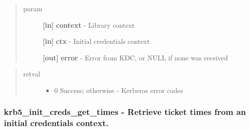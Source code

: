 \documentclass[letterpaper,10pt,english]{sphinxmanual}
\begin{document}
\begin{quote}\begin{description}
\item[{param}] \leavevmode
\textbf{{[}in{]}} \textbf{context} - Library context

\textbf{{[}in{]}} \textbf{ctx} - Initial credentials context

\textbf{{[}out{]}} \textbf{error} - Error from KDC, or NULL if none was received

\end{description}\end{quote}
\begin{quote}\begin{description}
\item[{retval}] \leavevmode\begin{itemize}
\item {} 
0   Success; otherwise - Kerberos error codes

\end{itemize}

\end{description}\end{quote}


\subsubsection{krb5\_init\_creds\_get\_times -  Retrieve ticket times from an initial credentials context.}
\label{appdev/refs/api/krb5_init_creds_get_times::doc}\label{appdev/refs/api/krb5_init_creds_get_times:krb5-init-creds-get-times-retrieve-ticket-times-from-an-initial-credentials-context}

\begin{fulllineitems}
\label{appdev/refs/api/krb5_init_creds_get_times:krb5_init_creds_get_times}
\end{fulllineitems}
\end{document}
